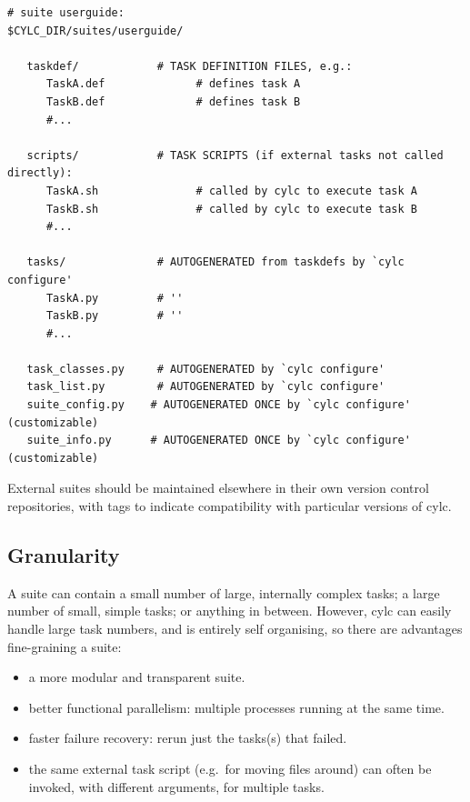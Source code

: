 \documentclass[11pt,a4paper]{article}
\begin{document}
\lstset{language=bash}

\begin{lstlisting}
# suite userguide:
$CYLC_DIR/suites/userguide/

   taskdef/            # TASK DEFINITION FILES, e.g.:
      TaskA.def              # defines task A
      TaskB.def              # defines task B
      #...

   scripts/            # TASK SCRIPTS (if external tasks not called directly):
      TaskA.sh               # called by cylc to execute task A
      TaskB.sh               # called by cylc to execute task B
      #...

   tasks/              # AUTOGENERATED from taskdefs by `cylc configure'
      TaskA.py         # '' 
      TaskB.py         # ''
      #...

   task_classes.py     # AUTOGENERATED by `cylc configure' 
   task_list.py        # AUTOGENERATED by `cylc configure' 
   suite_config.py    # AUTOGENERATED ONCE by `cylc configure' (customizable)
   suite_info.py      # AUTOGENERATED ONCE by `cylc configure' (customizable)
\end{lstlisting}

External suites should be maintained elsewhere in their own version
control repositories, with tags to indicate compatibility with
particular versions of cylc.

\subsection{Granularity} 
\label{Granularity}

A suite can contain a small number of large, internally complex tasks;
a large number of small, simple tasks; or anything in between. However,
cylc can easily handle large task numbers, and is entirely self
organising, so there are advantages fine-graining a suite:

\begin{itemize}
    \item a more modular and transparent suite.

    \item better functional parallelism: multiple processes running
        at the same time.

    \item faster failure recovery: rerun just the tasks(s) that failed. 

    \item the same external task script (e.g.\ for moving files around)
        can often be invoked, with different arguments, for multiple
        tasks.

\end{itemize}
\end{document}
